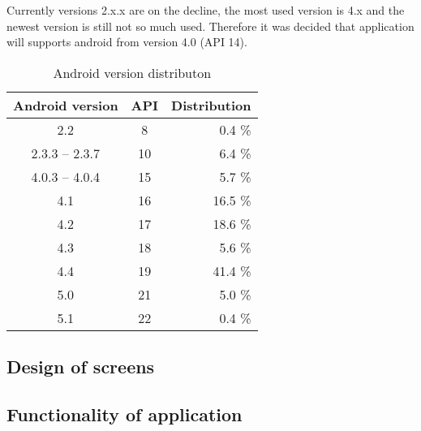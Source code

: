 Currently versions 2.x.x are on the decline, the most used version is 4.x and the newest version is still not so much used. Therefore it
was decided that application will supports android from version 4.0 (API 14).

\begin {table}[h!]
    \begin{tabular}{|c|c|r|}
        \hline
        Android version   & API   & Distribution  \\ \hline \hline
        2.2               & 8     & 0.4 \%        \\ \hline
        2.3.3 -- 2.3.7    & 10    & 6.4 \%        \\ \hline
        4.0.3 -- 4.0.4    & 15    & 5.7 \%        \\ \hline
        4.1               & 16    & 16.5 \%       \\ \hline
        4.2               & 17    & 18.6 \%       \\ \hline
        4.3               & 18    & 5.6 \%        \\ \hline
        4.4               & 19    & 41.4 \%       \\ \hline
        5.0               & 21    & 5.0 \%        \\ \hline
        5.1               & 22    & 0.4 \%        \\ \hline
    \end{tabular}
    \centering
    \caption{Android version distributon \cite{Dashboards}}
    \label{distributon}
\end{table}



\subsection{Design of screens}

\subsection{Functionality of application}

